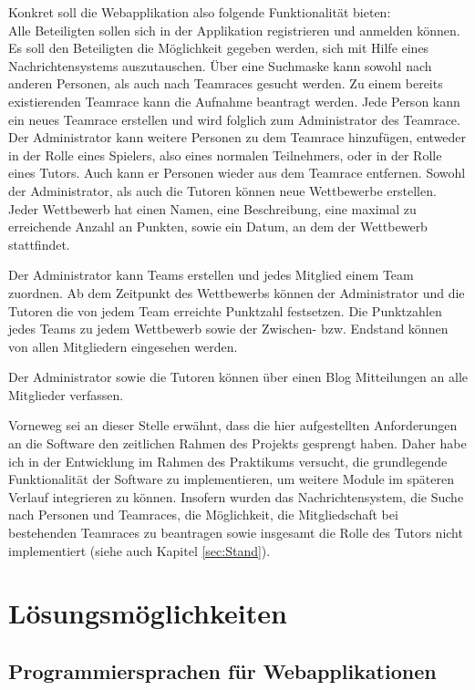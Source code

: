 \documentclass[12pt]{report}
\begin{document}
Konkret soll die Webapplikation also folgende Funktionalität bieten:\\
Alle Beteiligten sollen sich in der Applikation registrieren und anmelden können. Es soll den Beteiligten die Möglichkeit gegeben werden, sich mit Hilfe eines Nachrichtensystems auszutauschen. Über eine Suchmaske kann sowohl nach anderen Personen, als auch nach Teamraces gesucht werden. Zu einem bereits existierenden Teamrace kann die Aufnahme beantragt werden. Jede Person kann ein neues Teamrace erstellen und wird folglich zum Administrator des Teamrace. Der Administrator kann weitere Personen zu dem Teamrace hinzufügen, entweder in der Rolle eines Spielers, also eines normalen Teilnehmers, oder in der Rolle eines Tutors. Auch kann er Personen wieder aus dem Teamrace entfernen. Sowohl der Administrator, als auch die Tutoren können neue Wettbewerbe erstellen. Jeder Wettbewerb hat einen Namen, eine Beschreibung, eine maximal zu erreichende Anzahl an Punkten, sowie ein Datum, an dem der Wettbewerb stattfindet. 

Der Administrator kann Teams erstellen und jedes Mitglied einem Team zuordnen. Ab dem Zeitpunkt des Wettbewerbs können der Administrator und die Tutoren die von jedem Team erreichte Punktzahl festsetzen. Die Punktzahlen jedes Teams zu jedem Wettbewerb sowie der Zwischen- bzw. Endstand können von allen Mitgliedern eingesehen werden.

Der Administrator sowie die Tutoren können über einen Blog Mitteilungen an alle Mitglieder verfassen.

Vorneweg sei an dieser Stelle erwähnt, dass die hier aufgestellten Anforderungen an die Software den zeitlichen Rahmen des Projekts gesprengt haben. Daher habe ich in der Entwicklung im Rahmen des Praktikums versucht, die grundlegende Funktionalität der Software zu implementieren, um weitere Module im späteren Verlauf integrieren zu können. Insofern wurden das Nachrichtensystem, die Suche nach Personen und Teamraces, die Möglichkeit, die Mitgliedschaft bei bestehenden Teamraces zu beantragen sowie insgesamt die Rolle des Tutors nicht implementiert (siehe auch Kapitel \ref{sec:Stand}).



\chapter{Lösungsmöglichkeiten}

\section{Programmiersprachen für Webapplikationen}
\label{sec:Programmiersprachen}
\end{document}
